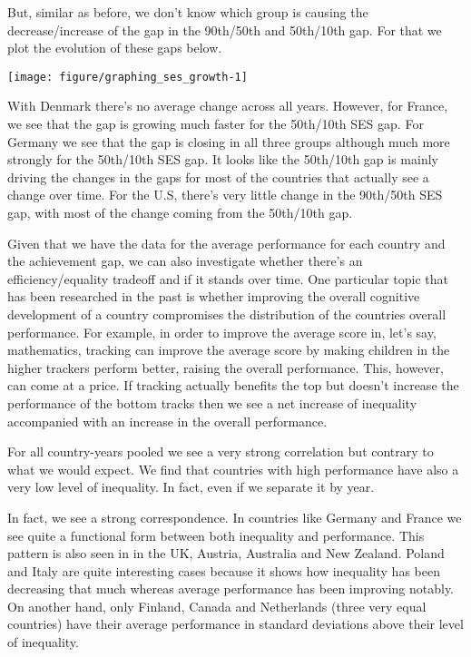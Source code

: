 \documentclass[11pt, a4paper]{article}\usepackage[]{graphicx}\usepackage[]{color}
\begin{document}
But, similar as before, we don't know which group is causing the decrease/increase of the gap in the 90th/50th and 50th/10th gap. For that we plot the evolution of these gaps below.




{\centering \texttt{[image: figure/graphing\_ses\_growth-1]} 

}




With Denmark there's no average change across all years. However, for France, we see that the gap is growing much faster for the 50th/10th SES gap. For Germany we see that the gap is closing in all three groups although much more strongly for the 50th/10th SES gap. It looks like the 50th/10th gap is mainly driving the changes in the gaps for most of the countries that actually see a change over time.  For the U.S, there's very little change in the 90th/50th SES gap, with most of the change coming from the 50th/10th gap.

Given that we have the data for the average performance for each country and the achievement gap, we can also investigate whether there's an efficiency/equality tradeoff and if it stands over time. One particular topic that has been researched in the past is whether improving the overall cognitive development of a country compromises the distribution of the countries overall performance. For example, in order to improve the average score in, let's say, mathematics, tracking can improve the average score by making children in the higher trackers perform better, raising the overall performance. This, however, can come at a price. If tracking actually benefits the top but doesn't increase the performance of the bottom tracks then we see a net increase of inequality accompanied with an increase in the overall performance.



For all country-years pooled we see a very strong correlation but contrary to what we would expect. We find that countries with high performance have also a very low level of inequality. In fact, even if we separate it by year.





In fact, we see a strong correspondence. In countries like Germany and France we see quite a functional form between both inequality and performance. This pattern is also seen in in the UK, Austria, Australia and New Zealand. Poland and Italy are quite interesting cases because it shows how inequality has been decreasing that much whereas average performance has been improving notably. On another hand, only Finland, Canada and Netherlands (three very equal countries) have their average performance in standard deviations above their level of inequality.
\end{document}
